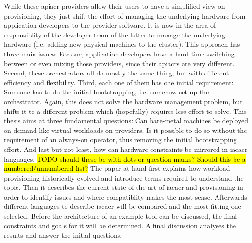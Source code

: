 \newline
While these \gls{apiacr}-providers allow their users to have a simplified view on provisioning, they just shift the effort of managing the underlying hardware from application developers to the provider software. It is now in the area of responsiblity of the developer team of the latter to manage the underlying hardware (i.e. adding new physical machines to the cluster).
\newline
This approach has three main issues: For one, application developers have a hard time switching between or even mixing those providers, since their \gls{apiacr}s are very different. Second, these orchestrators all do mostly the same thing, but with different efficiency and flexibility. Third, each one of them has one initial requirement: Someone has to do the initial bootstrapping, i.e. somehow set up the orchestrator. Again, this does not solve the hardware management problem, but shifts it to a different problem which (hopefully) requires less effort to solve.
\newline
This thesis aims at three fundamental questions: Can bare-metal machines be deployed on-demand like virtual workloads on providers. Is it possible to do so without the requirement of an always-on operator, thus removing the initial bootstrapping effort. And last but not least, how can hardware constraints be mirrored in \gls{iacacr} languages.
\hl{TODO should these be with dots or question marks? Should this be a numbered/unnumbered list?}
\newline
The paper at hand first explains how workload provisioning historically evolved and introduce terms required to understand the topic. Then it describes the current state of the art of \gls{iacacr} and provisioning in order to identify issues and where compatiblity makes the most sense. Afterwards different languages to describe \gls{iacacr} will be compared and the most fitting one selected.
Before the architecture of an example tool can be discussed, the final constraints and goals for it will be determined. A final discussion analyses the results and answer the initial questions.
